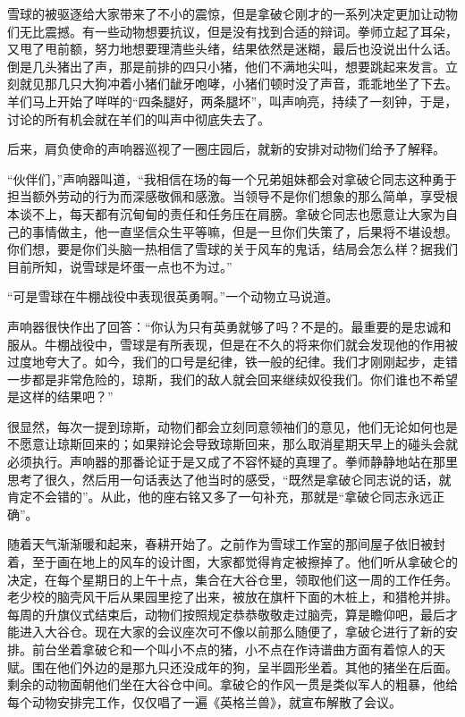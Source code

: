 雪球的被驱逐给大家带来了不小的震惊，但是拿破仑刚才的一系列决定更加让动物们无比震撼。有一些动物想要抗议，但是没有找到合适的辩词。拳师立起了耳朵，又甩了甩前额，努力地想要理清些头绪，结果依然是迷糊，最后也没说出什么话。倒是几头猪出了声，那是前排的四只小猪，他们不满地尖叫，想要跳起来发言。立刻就见那几只大狗冲着小猪们龇牙咆哮，小猪们顿时没了声音，乖乖地坐了下去。羊们马上开始了咩咩的“四条腿好，两条腿坏”，叫声响亮，持续了一刻钟，于是，讨论的所有机会就在羊们的叫声中彻底失去了。

后来，肩负使命的声响器巡视了一圈庄园后，就新的安排对动物们给予了解释。

“伙伴们，”声响器叫道，“我相信在场的每一个兄弟姐妹都会对拿破仑同志这种勇于担当额外劳动的行为而深感敬佩和感激。当领导不是你们想象的那么简单，享受根本谈不上，每天都有沉甸甸的责任和任务压在肩膀。拿破仑同志也愿意让大家为自己的事情做主，他一直坚信众生平等嘛，但是一旦你们失策了，后果将不堪设想。你们想，要是你们头脑一热相信了雪球的关于风车的鬼话，结局会怎么样？据我们目前所知，说雪球是坏蛋一点也不为过。”

“可是雪球在牛棚战役中表现很英勇啊。”一个动物立马说道。

声响器很快作出了回答：“你认为只有英勇就够了吗？不是的。最重要的是忠诚和服从。牛棚战役中，雪球是有所表现，但是在不久的将来你们就会发现他的作用被过度地夸大了。如今，我们的口号是纪律，铁一般的纪律。我们才刚刚起步，走错一步都是非常危险的，琼斯，我们的敌人就会回来继续奴役我们。你们谁也不希望是这样的结果吧？”

很显然，每次一提到琼斯，动物们都会立刻同意领袖们的意见，他们无论如何也是不愿意让琼斯回来的；如果辩论会导致琼斯回来，那么取消星期天早上的碰头会就必须执行。声响器的那番论证于是又成了不容怀疑的真理了。拳师静静地站在那里思考了很久，然后用一句话表达了他当时的感受，“既然是拿破仑同志说的话，就肯定不会错的”。从此，他的座右铭又多了一句补充，那就是“拿破仑同志永远正确”。

随着天气渐渐暖和起来，春耕开始了。之前作为雪球工作室的那间屋子依旧被封着，至于画在地上的风车的设计图，大家都觉得肯定被擦掉了。他们听从拿破仑的决定，在每个星期日的上午十点，集合在大谷仓里，领取他们这一周的工作任务。老少校的脑壳风干后从果园里挖了出来，被放在旗杆下面的木桩上，和猎枪并排。每周的升旗仪式结束后，动物们按照规定恭恭敬敬走过脑壳，算是瞻仰吧，最后才能进入大谷仓。现在大家的会议座次可不像以前那么随便了，拿破仑进行了新的安排。前台坐着拿破仑和一个叫小不点的猪，小不点在作诗谱曲方面有着惊人的天赋。围在他们外边的是那九只还没成年的狗，呈半圆形坐着。其他的猪坐在后面。剩余的动物面朝他们坐在大谷仓中间。拿破仑的作风一贯是类似军人的粗暴，他给每个动物安排完工作，仅仅唱了一遍《英格兰兽》，就宣布解散了会议。

